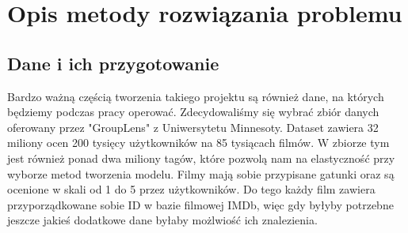 \documentclass{article}
\begin{document}
\section{Opis metody rozwiązania problemu}

\subsection{Dane i ich przygotowanie}
Bardzo ważną częścią tworzenia takiego projektu są również dane, na których będziemy podczas pracy operować. Zdecydowaliśmy się wybrać zbiór danych oferowany przez "GroupLens" z Uniwersytetu Minnesoty.
Dataset zawiera 32 miliony ocen 200 tysięcy użytkowników na 85 tysiącach filmów. W zbiorze tym jest również ponad dwa miliony tagów, które pozwolą nam na elastyczność przy wyborze metod tworzenia modelu. Filmy mają sobie przypisane gatunki oraz są ocenione w skali od 1 do 5 przez użytkowników. Do tego każdy film zawiera przyporządkowane sobie ID w bazie filmowej IMDb, więc gdy byłyby potrzebne jeszcze jakieś dodatkowe dane byłaby możlwiość ich znalezienia.
\end{document}
